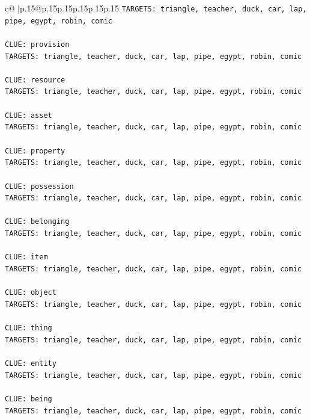 \documentclass{article}
\begin{document}
{\begin{supertabular}{c@{$\;$}|p{.15\linewidth}@{}p{.15\linewidth}p{.15\linewidth}p{.15\linewidth}p{.15\linewidth}p{.15\linewidth}}
{{{\texttt{TARGETS: triangle, teacher, duck, car, lap, pipe, egypt, robin, comic} \\
\\ 
\texttt{CLUE: provision} \\
\texttt{TARGETS: triangle, teacher, duck, car, lap, pipe, egypt, robin, comic} \\
\\ 
\texttt{CLUE: resource} \\
\texttt{TARGETS: triangle, teacher, duck, car, lap, pipe, egypt, robin, comic} \\
\\ 
\texttt{CLUE: asset} \\
\texttt{TARGETS: triangle, teacher, duck, car, lap, pipe, egypt, robin, comic} \\
\\ 
\texttt{CLUE: property} \\
\texttt{TARGETS: triangle, teacher, duck, car, lap, pipe, egypt, robin, comic} \\
\\ 
\texttt{CLUE: possession} \\
\texttt{TARGETS: triangle, teacher, duck, car, lap, pipe, egypt, robin, comic} \\
\\ 
\texttt{CLUE: belonging} \\
\texttt{TARGETS: triangle, teacher, duck, car, lap, pipe, egypt, robin, comic} \\
\\ 
\texttt{CLUE: item} \\
\texttt{TARGETS: triangle, teacher, duck, car, lap, pipe, egypt, robin, comic} \\
\\ 
\texttt{CLUE: object} \\
\texttt{TARGETS: triangle, teacher, duck, car, lap, pipe, egypt, robin, comic} \\
\\ 
\texttt{CLUE: thing} \\
\texttt{TARGETS: triangle, teacher, duck, car, lap, pipe, egypt, robin, comic} \\
\\ 
\texttt{CLUE: entity} \\
\texttt{TARGETS: triangle, teacher, duck, car, lap, pipe, egypt, robin, comic} \\
\\ 
\texttt{CLUE: being} \\
\texttt{TARGETS: triangle, teacher, duck, car, lap, pipe, egypt, robin, comic} \\
}}}
\end{supertabular}}
\end{document}
